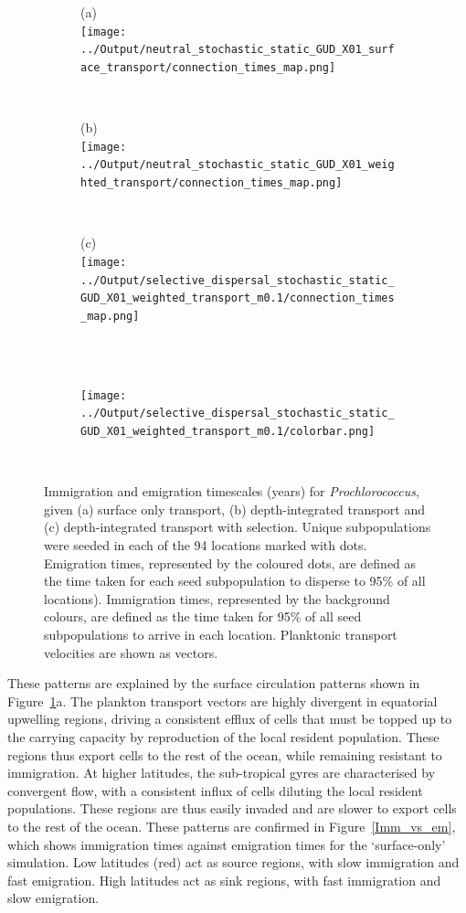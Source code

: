 \documentclass[12pt]{article}
\begin{document}
\begin{figure}[htp]
        \centering
\begin{subfigure}[t]{.66\textwidth}
(a)\\
\centering
\texttt{[image: ../Output/neutral\_stochastic\_static\_GUD\_X01\_surface\_transport/connection\_times\_map.png]}
    \end{subfigure}%
\\
\begin{subfigure}{.66\textwidth}
(b)\\
        \centering
 \texttt{[image: ../Output/neutral\_stochastic\_static\_GUD\_X01\_weighted\_transport/connection\_times\_map.png]}
    \end{subfigure}%
    \\
\begin{subfigure}{.66\textwidth}
(c)\\
        \centering
\texttt{[image: ../Output/selective\_dispersal\_stochastic\_static\_GUD\_X01\_weighted\_transport\_m0.1/connection\_times\_map.png]}
    \end{subfigure}%
    \\~\\
\begin{subfigure}{.66\textwidth}
        \centering
\texttt{[image: ../Output/selective\_dispersal\_stochastic\_static\_GUD\_X01\_weighted\_transport\_m0.1/colorbar.png]}
    \end{subfigure}%
    \\
    \caption{Immigration and emigration timescales (years) for \textit{Prochlorococcus}, given (a) surface only transport, (b) depth-integrated transport and (c) depth-integrated transport with selection. Unique subpopulations were seeded in each of the 94 locations marked with dots. Emigration times, represented by the coloured dots, are defined as the time taken for each seed subpopulation to disperse to 95\% of all locations). Immigration times, represented by the background colours, are defined as the time taken for 95\% of all seed subpopulations to arrive in each location. Planktonic transport velocities are shown as vectors.}
\label{Connectivity_map_pro}
\end{figure}

These patterns are explained by the surface circulation patterns shown in Figure~\ref{Connectivity_map_pro}a. The plankton transport vectors are highly divergent in equatorial upwelling regions, driving a consistent efflux of cells that must be topped up to the carrying capacity by reproduction of the local resident population. These regions thus export cells to the rest of the ocean, while remaining resistant to immigration. At higher latitudes, the sub-tropical gyres are characterised by convergent flow, with a consistent influx of cells diluting the local resident populations. These regions are thus easily invaded and are slower to export cells to the rest of the ocean. These patterns are confirmed in Figure~\ref{Imm_vs_em}, which shows immigration times against emigration times for the `surface-only' simulation. Low latitudes (red) act as source regions, with slow immigration and fast emigration. High latitudes act as sink regions, with fast immigration and slow emigration.
\end{document}
